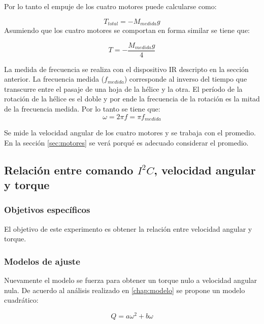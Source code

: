 \documentclass[main]{subfiles}
\begin{document}
Por lo tanto el empuje de los cuatro motores puede calcularse como:

\begin{equation}
T_{total}=-M_{medida}g
\end{equation}
Asumiendo que los cuatro motores se comportan en forma similar se tiene que:

\begin{equation}
T=-\frac{M_{medida}g}{4}
\end{equation}

La medida de frecuencia se realiza con el dispositivo IR descripto en la secci\'on anterior. La frecuencia medida ($f_{medida}$) corresponde al inverso del tiempo que transcurre entre el pasaje de una hoja de la h\'elice y la otra. El per\'iodo de la rotaci\'on de la h\'elice es el doble y por ende la frecuencia de la rotaci\'on es la mitad de la frecuencia medida. Por lo tanto se tiene que:
\begin{equation}
\label{eq:omega_ir}
\omega=2\pi f=\pi f_{medida}
\end{equation}

Se mide la velocidad angular de los cuatro motores y se trabaja con el promedio. En la secci\'on \ref{sec:motores} se ver\'a porqu\'e es adecuado considerar el promedio.

\subsection{Relaci\'on entre comando $I^2C$, velocidad angular y torque}

\subsubsection*{Objetivos espec\'ificos}
El objetivo de este experimento es obtener la relaci\'on entre velocidad angular y torque.

\subsubsection*{Modelos de ajuste}
Nuevamente el modelo se fuerza para obtener un torque nulo a velocidad angular nula. De acuerdo al an\'alisis realizado en \ref{chap:modelo} se propone un modelo cuadr\'atico:

$$Q=a\omega^2+b\omega$$
\end{document}
